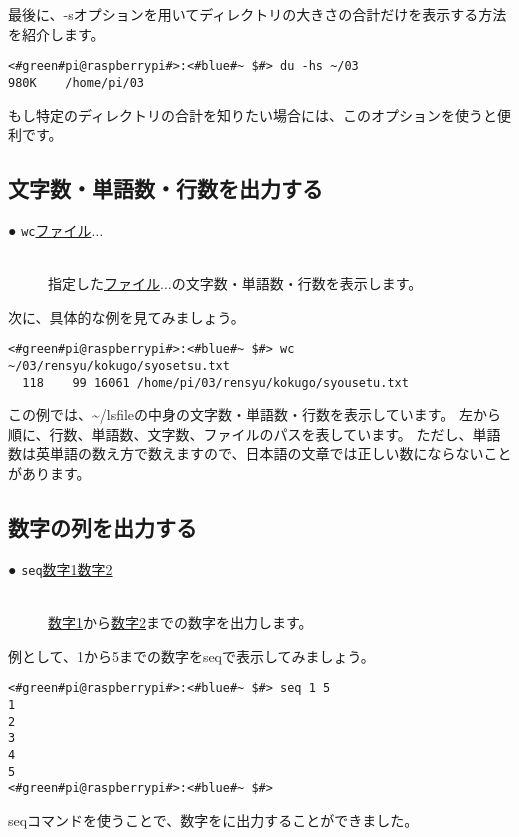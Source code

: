 最後に、-sオプションを用いてディレクトリの大きさの合計だけを表示する方法を紹介します。
\begin{lstlisting}[caption=du -hsの実行例, label=du_example]
<#green#pi@raspberrypi#>:<#blue#~ $#> du -hs ~/03
980K	/home/pi/03
\end{lstlisting}
もし特定のディレクトリの合計を知りたい場合には、このオプションを使うと便利です。

\subsection{文字数・単語数・行数を出力する}
\begin{description}
    \item[● \texttt{wc}\textvisiblespace \underline{ファイル}$\ldots$]\mbox{}\\
    指定した\underline{ファイル}$\ldots$の文字数・単語数・行数を表示します。
\end{description}
次に、具体的な例を見てみましょう。
\begin{lstlisting}[caption=wcコマンドの実行例, label=wc_example]
<#green#pi@raspberrypi#>:<#blue#~ $#> wc ~/03/rensyu/kokugo/syosetsu.txt
  118    99 16061 /home/pi/03/rensyu/kokugo/syousetu.txt
\end{lstlisting}
この例では、\textasciitilde/lsfileの中身の文字数・単語数・行数を表示しています。
左から順に、行数、単語数、文字数、ファイルのパスを表しています。
ただし、単語数は英単語の数え方で数えますので、日本語の文章では正しい数にならないことがあります。

\subsection{数字の列を出力する}
\begin{description}
    \item[● \texttt{seq}\textvisiblespace \underline{数字1}\textvisiblespace \underline{数字2}]\mbox{}\\
    \underline{数字1}から\underline{数字2}までの数字を出力します。
\end{description}
例として、1から5までの数字をseqで表示してみましょう。
\begin{lstlisting}[caption=seqコマンド]
<#green#pi@raspberrypi#>:<#blue#~ $#> seq 1 5
1
2
3
4
5
<#green#pi@raspberrypi#>:<#blue#~ $#>
\end{lstlisting}
seqコマンドを使うことで、数字をに出力することができました。

